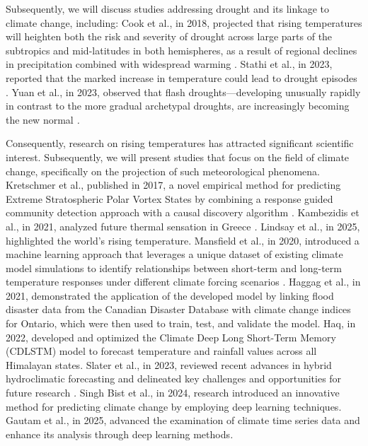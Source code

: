 \documentclass[12pt]{Definitions/academia}
\begin{document}
Subsequently, we will discuss studies addressing drought and its linkage
to climate change, including: Cook et al., in 2018, projected that
rising temperatures will heighten both the risk and severity of drought
across large parts of the subtropics and mid-latitudes in both hemispheres,
as a result of regional declines in precipitation combined with widespread
warming \textit{\cite{Cook 2018}}. Stathi et al., in 2023, reported
that the marked increase in temperature could lead to drought episodes
\textit{\cite{Stathi 2023}}. Yuan et al., in 2023, observed that
flash droughts---developing unusually rapidly in contrast to the
more gradual archetypal droughts, are increasingly becoming the new
normal \textit{\cite{Yuan 2023}.}

Consequently, research on rising temperatures has attracted significant
scientific interest. Subsequently, we will present studies that focus
on the field of climate change, specifically on the projection of
such meteorological phenomena.\\
 Kretschmer et al., published in 2017,
a novel empirical method for predicting Extreme Stratospheric Polar
Vortex States by combining a response guided community detection approach
with a causal discovery algorithm \textit{\cite{Kretschmer 2017}}.
Kambezidis et al., in 2021, analyzed future thermal sensation in Greece
\textit{\cite{Kambezidis 2021}.} Lindsay et al., in 2025, highlighted
the world's rising temperature\textit{\cite{Lindsey 2025}}. Mansfield
et al., in 2020, introduced a machine learning approach that leverages
a unique dataset of existing climate model simulations to identify
relationships between short-term and long-term temperature responses
under different climate forcing scenarios \textit{\cite{Mansfield 2020}}.
Haggag et al., in 2021, demonstrated the application of the developed
model by linking flood disaster data from the Canadian Disaster Database
with climate change indices for Ontario, which were then used to train,
test, and validate the model\textit{\cite{Haggag 2021}}. Haq, in
2022, developed and optimized the Climate Deep Long Short-Term Memory
(CDLSTM) model to forecast temperature and rainfall values across
all Himalayan states\textit{\cite{Haq 2022}}. Slater et al., in 2023,
reviewed recent advances in hybrid hydroclimatic forecasting and delineated
key challenges and opportunities for future research \textit{\cite{Slater 2023}.}
Singh Bist et al., in 2024, research introduced an innovative method
for predicting climate change by employing deep learning techniques\textit{\cite{Bist 2024}}.
Gautam et al., in 2025, advanced the examination of climate time series
data and enhance its analysis through deep learning methods\textit{\cite{GAUTAM 2025}. }
\end{document}

